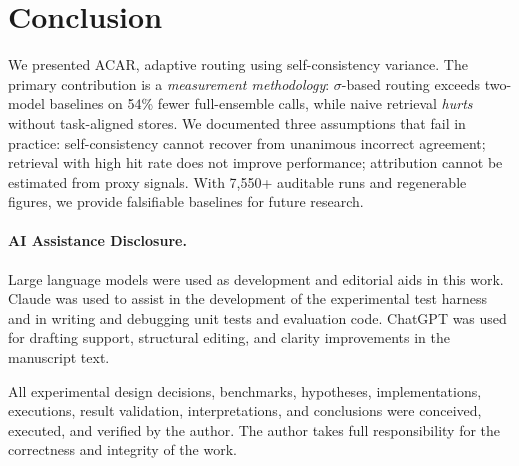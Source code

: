 \documentclass{article}
\newcommand{\acar}{\textsc{ACAR}}
\begin{document}
\section{Conclusion}

We presented \acar{}, adaptive routing using self-consistency variance. The primary contribution is a \emph{measurement methodology}: $\sigma$-based routing exceeds two-model baselines on 54\% fewer full-ensemble calls, while naive retrieval \emph{hurts} without task-aligned stores. We documented three assumptions that fail in practice: self-consistency cannot recover from unanimous incorrect agreement; retrieval with high hit rate does not improve performance; attribution cannot be estimated from proxy signals. With 7,550+ auditable runs and regenerable figures, we provide falsifiable baselines for future research.

\paragraph{AI Assistance Disclosure.}
Large language models were used as development and editorial aids in this work. Claude was used to assist in the development of the experimental test harness and in writing and debugging unit tests and evaluation code. ChatGPT was used for drafting support, structural editing, and clarity improvements in the manuscript text.

All experimental design decisions, benchmarks, hypotheses, implementations, executions, result validation, interpretations, and conclusions were conceived, executed, and verified by the author. The author takes full responsibility for the correctness and integrity of the work.
\end{document}
